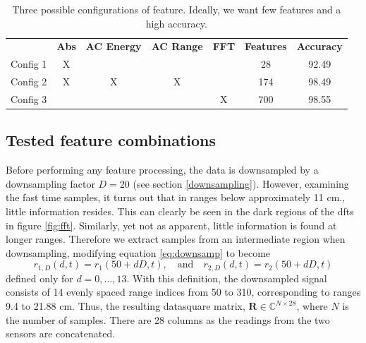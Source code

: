 

\begin{table}
\begin{center}
  \begin{tabular}{|c|cccccc|}
\hline
    \rowcolor{gray!150}
		  & \color{white}\textbf{Abs} & \color{white}\textbf{AC Energy} & \color{white}\textbf{AC Range} & \color{white}\textbf{FFT} & \color{white}\textbf{Features} & \color{white}\textbf{Accuracy} \\
	  Config 1 & X &   &   &   & 28  & 92.49 \\
	  Config 2 & X & X & X & & 174 & 98.49 \\
	  Config 3 & & & & X & 700 & 98.55 \\
\hline
  \end{tabular}
\end{center}
\caption{Three possible configurations of feature. Ideally, we want few features and a high accuracy.}
\label{tab:feat}
\end{table}


\subsection{Tested feature combinations}
Before performing any feature processing, the data is downsampled by a downsampling factor $D=20$ (see section \ref{downsampling}). However, examining the fast time samples, it turns out that in ranges below approximately 11 cm., little information resides. This can clearly be seen in the dark regions of the \gls{dft}s in figure \ref{fig:fft}. Similarly, yet not as apparent, little information is found at longer ranges. Therefore we extract samples from an intermediate region when downsampling, modifying equation \eqref{eq:downsamp} to become
\begin{equation}
	r_{1,D}(d, t) = r_{1}(50+dD,t), 
	\quad \text{and} \quad r_{2,D}(d,t) = r_{2}(50+dD,t)
\end{equation}
defined only for $d=0,...,13$. With this definition, the downsampled signal consists of 14 evenly spaced range indices from 50 to 310, corresponding to ranges 9.4 to 21.88 cm. Thus, the resulting datasquare matrix, $\mathbf{R}\in \mathbb{C}^{N\times 28}$, where $N$ is the number of samples. There are 28 columns as the readings from the two sensors are concatenated. 

